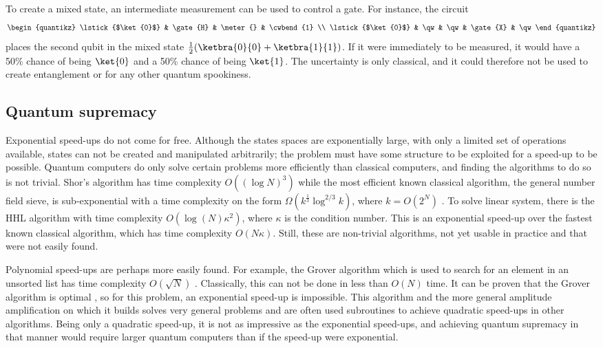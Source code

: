 To create a mixed state, an intermediate measurement can be used to control a gate.
For instance, the circuit
\begin{equation}
    \begin{quantikz}
        \lstick{$\ket{0}$} & \gate{H} & \meter{} & \cwbend{1} \\
        \lstick{$\ket{0}$} & \qw & \qw & \gate{X} & \qw
    \end{quantikz}
\end{equation}
places the second qubit in the mixed state $\frac{1}{2}(\ketbra{0}{0} + \ketbra{1}{1})$.
If it were immediately to be measured, it would have a 50\% chance of being $\ket{0}$ and a 50\% chance of being $\ket{1}$.
The uncertainty is only classical, and it could therefore not be used to create entanglement or for any other quantum spookiness.

\subsection{Quantum supremacy}
Exponential speed-ups do not come for free.
Although the states spaces are exponentially large, with only a limited set of operations available, states can not be created and manipulated arbitrarily; the problem must have some structure to be exploited for a speed-up to be possible.
Quantum computers do only solve certain problems more efficiently than classical computers, and finding the algorithms to do so is not trivial.
Shor's algorithm has time complexity $O((\log N)^3)$ while the most efficient known classical algorithm, the general number field sieve, is sub-exponential with a time complexity on the form $\Omega(k^{\frac{1}{3}}\log^{2/3}k)$, where $k=O(2^N)$ \cite{dervovic2018}.
To solve linear system, there is the HHL algorithm with time complexity $O(\log(N)\kappa^2)$, where $\kappa$ is the condition number.
This is an exponential speed-up over the fastest known classical algorithm\footnotemark{}, which has time complexity $O(N \kappa)$.
Still, these are non-trivial algorithms, not yet usable in practice and that were not easily found.


Polynomial speed-ups are perhaps more easily found.
For example, the Grover algorithm which is used to search for an element in an unsorted list has time complexity $O(\sqrt{N})$ \cite{grover1996}.
Classically, this can not be done in less than $O(N)$ time.
It can be proven that the Grover algorithm is optimal \cite{zalka1999}, so for this problem, an exponential speed-up is impossible.
This algorithm and the more general amplitude amplification on which it builds solves very general problems and are often used subroutines to achieve quadratic speed-ups in other algorithms.
Being only a quadratic speed-up, it is not as impressive as the exponential speed-ups, and achieving quantum supremacy in that manner would require larger quantum computers than if the speed-up were exponential.

